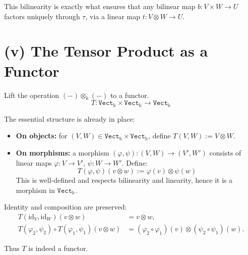\documentclass[10pt]{tufte-handout}
\begin{document}

This bilinearity is exactly what ensures that any bilinear map $b : V \times W \to U$ factors uniquely through $\tau$, via a linear map $t : V \otimes W \to U$.



\section{(v) The Tensor Product as a Functor}
Lift the operation $(-) \otimes_{\mathds{k}} (-)$ to a functor.
\[
T : \texttt{Vect}_{\mathds{k}} \times \texttt{Vect}_{\mathds{k}} \to \texttt{Vect}_{\mathds{k}}
\]

The essential structure is already in place:

\begin{itemize}
  \item \textbf{On objects:} for $(V, W) \in \texttt{Vect}_{\mathds{k}} \times \texttt{Vect}_{\mathds{k}}$, define $T(V, W) := V \otimes W$.

  \item \textbf{On morphisms:} a morphism $(\varphi, \psi): (V, W) \to (V', W')$ consists of linear maps $\varphi: V \to V'$, $\psi: W \to W'$. Define:
  \[
  T(\varphi, \psi)(v \otimes w) := \varphi(v) \otimes \psi(w)
  \]
  This is well-defined and respects bilinearity and linearity, hence it is a morphism in $\texttt{Vect}_{\mathds{k}}$.
\end{itemize}


Identity and composition are preserved:
\begin{align*}
T(\text{id}_V, \text{id}_W)(v \otimes w) &= v \otimes w, \\
T(\varphi_2, \psi_2) \circ T(\varphi_1, \psi_1)(v \otimes w) &= (\varphi_2 \circ \varphi_1)(v) \otimes (\psi_2 \circ \psi_1)(w).
\end{align*}

Thus $T$ is indeed a functor.

\end{document}
